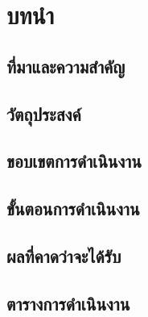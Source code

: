 \chapter{บทนำ}
\label{chapter1}

\section{ที่มาและความสำคัญ}

\section{วัตถุประสงค์}

\section{ขอบเขตการดำเนินงาน}

\section{ขั้นตอนการดำเนินงาน}

\section{ผลที่คาดว่าจะได้รับ}

\section{ตารางการดำเนินงาน}
